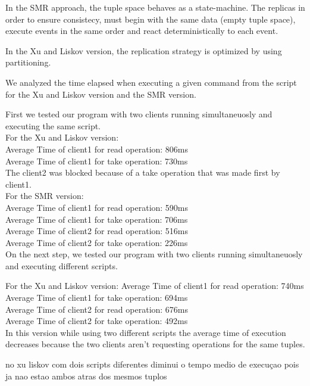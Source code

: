 \documentclass[times, 10pt,two column]{article}
\begin{document}
In the SMR approach, the tuple space behaves as a state-machine. The replicas in order to ensure consistecy, must begin with the same data (empty tuple space), execute events in the same order and react deterministically to each event.

In the Xu and Liskov version, the replication strategy is optimized by using partitioning.

We analyzed the time elapsed when executing a given command from the script for the Xu and Liskov version and the SMR version.


First we tested our program with two clients running simultaneuosly and executing the same script.\\

For the Xu and Liskov version:\\
    Average Time of client1 for read operation: 806ms\\
    Average Time of client1 for take operation: 730ms\\
    The client2 was blocked because of a take operation that was made first by client1.\\

For the SMR version:\\
    Average Time of client1 for read operation: 590ms\\
    Average Time of client1 for take operation: 706ms\\
    Average Time of client2 for read operation: 516ms\\
    Average Time of client2 for take operation: 226ms\\
    
On the next step, we tested our program with two clients running simultaneuosly and executing different scripts.
    
For the Xu and Liskov version:
    Average Time of client1 for read operation: 740ms\\
    Average Time of client1 for take operation: 694ms\\
    Average Time of client2 for read operation: 676ms\\
    Average Time of client2 for take operation: 492ms\\
    
    In this version while using two different scripts the average time of execution decreases because the two clients aren't requesting operations for the same tuples.
    
    
    no xu liskov com dois scripts diferentes diminui o tempo medio de execuçao pois ja nao estao ambos atras dos mesmos tuplos
\end{document}
